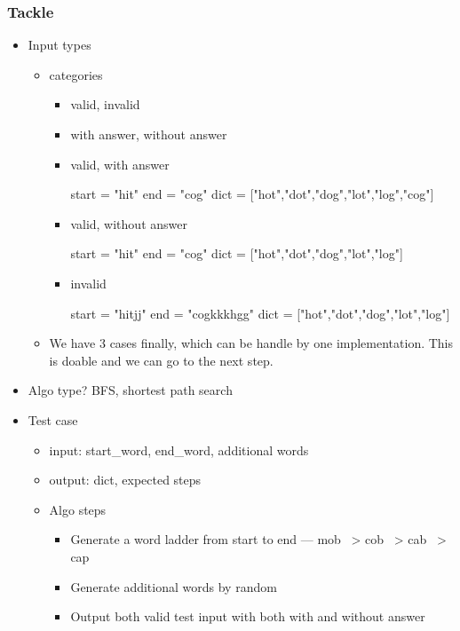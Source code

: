 \subsubsection{Tackle}
\begin{itemize}
  \item Input types
  \begin{itemize}
    \item categories
    \begin{itemize}
      \item valid, invalid
      \item with answer, without answer
    \end{itemize}
    \begin{itemize}
      \item valid, with answer
      \begin{Code}
start = "hit"
end = "cog"
dict = ["hot","dot","dog","lot","log","cog"]
      \end{Code}
      \item valid, without answer
      \begin{Code}
start = "hit"
end = "cog"
dict = ["hot","dot","dog","lot","log"]
      \end{Code}
      \item invalid   
      \begin{Code}
start = "hitjj"
end = "cogkkkhgg"
dict = ["hot","dot","dog","lot","log"]
      \end{Code}   
    \end{itemize}
    \item We have 3 cases finally, which can be handle by one implementation. This is doable and we can go to the next step.
  \end{itemize}
  \item Algo type? BFS, shortest path search
  \item Test case
  \begin{itemize}
    \item input: start_word, end_word, additional words
    \item output: dict, expected steps
    \item Algo steps
    \begin{itemize}
      \item Generate a word ladder from start to end --- mob ~> cob ~> cab ~> cap
      \item Generate additional words by random
      \item Output both valid test input with both with and without answer

\end{itemize}
\end{itemize}
\end{itemize}
